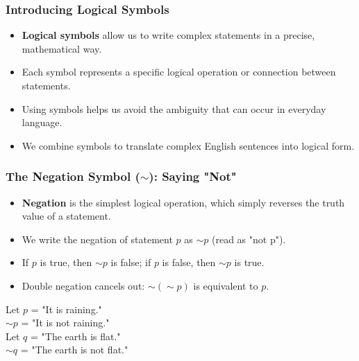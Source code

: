 \documentclass{beamer}
\begin{document}
\begin{frame}
\frametitle{Introducing Logical Symbols}
\begin{itemize}
    \item \textbf{Logical symbols} allow us to write complex statements in a precise, mathematical way.
    \item Each symbol represents a specific logical operation or connection between statements.
    \item Using symbols helps us avoid the ambiguity that can occur in everyday language.
    \item We combine symbols to translate complex English sentences into logical form.
\end{itemize}

\begin{center}
\end{center}
\end{frame}


\begin{frame}
    \frametitle{The Negation Symbol ($\sim$): Saying "Not"}
    \begin{itemize}
        \item \textbf{Negation} is the simplest logical operation, which simply reverses the truth value of a statement.
        \item We write the negation of statement $p$ as $\sim p$ (read as "not p").
        \item If $p$ is true, then $\sim p$ is false; if $p$ is false, then $\sim p$ is true.
        \item Double negation cancels out: $\sim(\sim p)$ is equivalent to $p$.
    \end{itemize}
    
    \begin{example}
    Let $p$ = "It is raining."\\
    $\sim p$ = "It is not raining."\\
    Let $q$ = "The earth is flat."\\
    $\sim q$ = "The earth is not flat."
    \end{example}
    \end{frame}
    
\end{document}
